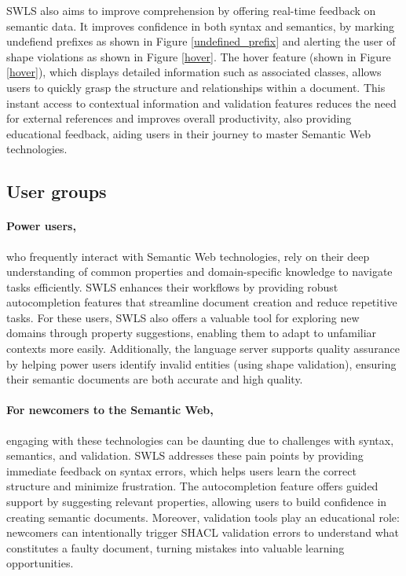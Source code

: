 SWLS also aims to improve comprehension by offering real-time feedback on semantic data.
It improves confidence in both syntax and semantics, by marking undefiend prefixes as shown in Figure \ref{undefined_prefix}
and alerting the user of shape violations as shown in Figure \ref{hover}.
The hover feature (shown in Figure \ref{hover}), which displays detailed information such as associated classes,
allows users to quickly grasp the structure and relationships within a document. 
This instant access to contextual information and validation features reduces the need for external references and improves overall productivity,
also providing educational feedback, aiding users in their journey to master Semantic Web technologies.

\subsection{User groups}

\paragraph{Power users,} who frequently interact with Semantic Web technologies, rely on their deep understanding of common properties and domain-specific knowledge to navigate tasks efficiently.
SWLS enhances their workflows by providing robust autocompletion features that streamline document creation and reduce repetitive tasks.
For these users, SWLS also offers a valuable tool for exploring new domains through property suggestions, enabling them to adapt to unfamiliar contexts more easily. 
Additionally, the language server supports quality assurance by helping power users identify invalid entities (using shape validation), ensuring their semantic documents are both accurate and high quality.

\paragraph{For newcomers to the Semantic Web,} engaging with these technologies can be daunting due to challenges with syntax, semantics, and validation. 
SWLS addresses these pain points by providing immediate feedback on syntax errors, which helps users learn the correct structure and minimize frustration.
The autocompletion feature offers guided support by suggesting relevant properties, allowing users to build confidence in creating semantic documents.
Moreover, validation tools play an educational role: newcomers can intentionally trigger SHACL validation errors to understand what constitutes a faulty document,
turning mistakes into valuable learning opportunities.

